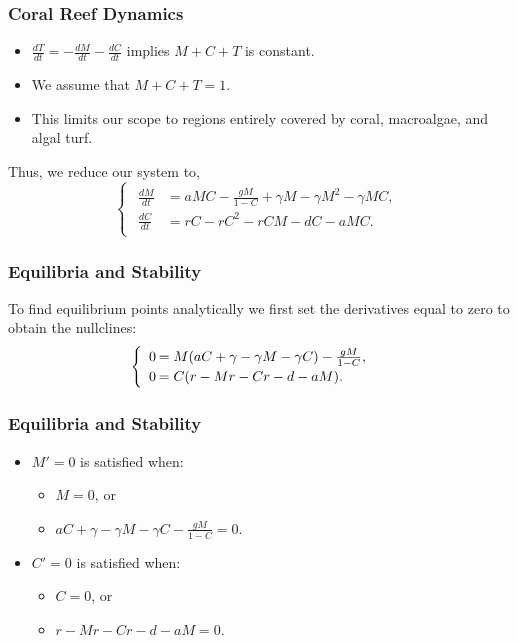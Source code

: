 \begin{frame}\frametitle{Coral Reef Dynamics}

\hspace{1.57em}

\begin{itemize}
\item $\frac{dT}{dt}=-\frac{dM}{dt}-\frac{dC}{dt}$ implies $M+C+T$ is
  constant.
\item We assume that $M+C+T=1$.
\item This limits our scope to regions entirely covered by coral,
  macroalgae, and algal turf. 
\end{itemize}

Thus, we reduce our system to, 
$$\begin{cases}
\begin{array}{rl}
\frac{dM}{dt}&= aMC-\frac{gM}{1-C} + \gamma M - \gamma M^2 -\gamma M C,\\
\frac{dC}{dt}&=rC - rC^2 - rCM - dC - aMC.
\end{array} 
\end{cases}$$
\end{frame}

\begin{frame}\frametitle{Equilibria and Stability}
To find equilibrium points analytically we first set the derivatives equal to zero to obtain the nullclines:
$$\begin{cases}
\begin{array}{rl}
0\hspace{-.8em}&=M(aC + \gamma-\gamma M-\gamma C) - \frac{gM}{1-C},\\
0\hspace{-.8em}&=C(r-Mr-Cr - d - aM).
\end{array}
\end{cases}$$
\end{frame}



\begin{frame}\frametitle{Equilibria and Stability}

  \begin{itemize}
  \item $M'=0$ is satisfied when:
    \begin{itemize}
    \item $M=0$, or 
    \item
      $aC + \gamma - \gamma M - \gamma C -
      \frac{gM}{1-C}=0$.
    \end{itemize}
  \item $C'=0$ is satisfied when:
    \begin{itemize} 
    \item$C=0$, or 
    \item $r-Mr-Cr-d-aM=0$. 
    \end{itemize}
  \end{itemize}

\end{frame}



